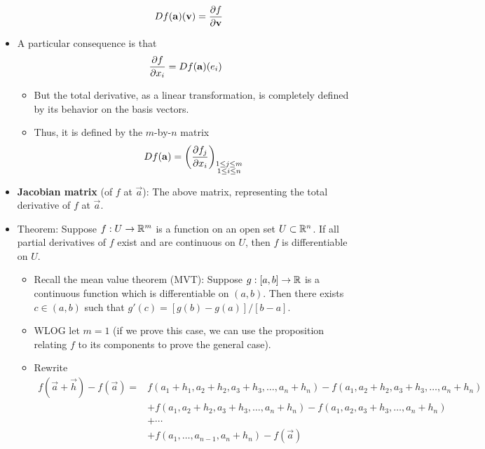 \documentclass[../notes.tex]{subfiles}
\begin{document}
\begin{itemize}
\begin{itemize}
\begin{align*}
            Df(\mathbf{a})(\mathbf{v}) &= \pdv{f}{\mathbf{v}}
        \end{align*}
    \end{itemize}
    \item A particular consequence is that
    \begin{equation*}
        \pdv{f}{x_i}(\mathbf{a}) = Df(\mathbf{a})(e_i)
    \end{equation*}
    \begin{itemize}
        \item But the total derivative, as a linear transformation, is completely defined by its behavior on the basis vectors.
        \item Thus, it is defined by the $m$-by-$n$ matrix
        \begin{equation*}
            Df(\mathbf{a}) = \left( \pdv{f_j}{x_i} \right)_{\substack{1\leq j\leq m\\1\leq i\leq n}}
        \end{equation*}
    \end{itemize}
    \item \textbf{Jacobian matrix} (of $f$ at $\vec{a}$): The above matrix, representing the total derivative of $f$ at $\vec{a}$.
    \item Theorem: Suppose $f:U\to\mathbb{R}^m$ is a function on an open set $U\subset\mathbb{R}^n$. If all partial derivatives of $f$ exist and are continuous on $U$, then $f$ is differentiable on $U$.
    \begin{itemize}
        \item Recall the mean value theorem (MVT): Suppose $g:[a,b]\to\mathbb{R}$ is a continuous function which is differentiable on $(a,b)$. Then there exists $c\in(a,b)$ such that $g'(c)=[g(b)-g(a)]/[b-a]$.
        \item WLOG let $m=1$ (if we prove this case, we can use the proposition relating $f$ to its components to prove the general case).
        \item Rewrite
        \begin{equation*}
            \begin{split}
                f(\vec{a}+\vec{h})-f(\vec{a}) ={}& f(a_1+h_1,a_2+h_2,a_3+h_3,\dots,a_n+h_n)-f(a_1,a_2+h_2,a_3+h_3,\dots,a_n+h_n)\\
                &+ f(a_1,a_2+h_2,a_3+h_3,\dots,a_n+h_n)-f(a_1,a_2,a_3+h_3,\dots,a_n+h_n)\\
                &+ \cdots\\
                &+ f(a_1,\dots,a_{n-1},a_n+h_n)-f(\vec{a})
            \end{split}

\end{equation*}
\end{itemize}
\end{itemize}
\end{document}
